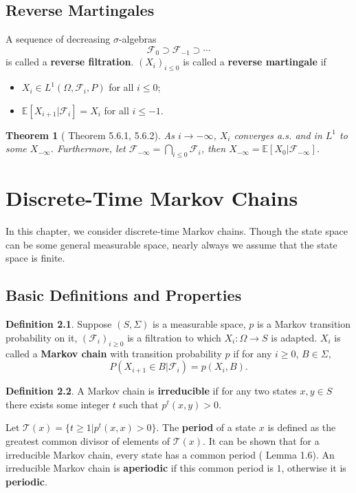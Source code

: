 \documentclass[openany]{book}
\newtheorem{theorem}{Theorem}[chapter]
\theoremstyle{definition}
\newtheorem{definition}{Definition}[chapter]
\theoremstyle{remark}
\begin{document}
\section{Reverse Martingales}
A sequence of decreasing $\sigma$-algebras
\begin{equation*}
    \mathcal{F}_0\supset \mathcal{F}_{-1}\supset\cdots
\end{equation*}
is called a \textbf{reverse filtration}. $(X_i)_{i\le0}$ is called a \textbf{reverse martingale} if
\begin{itemize}
    \item $X_i\in L^1(\Omega,\mathcal{F}_i,P)$ for all $i\le0$;
    \item $\mathbb{E}[X_{i+1}|\mathcal{F}_i]=X_i$ for all $i\le-1$.
\end{itemize}
\begin{theorem}[\cite{D10} Theorem 5.6.1, 5.6.2]
    As $i\to-\infty$, $X_i$ converges a.s. and in $L^1$ to some $X_{-\infty}$. Furthermore, let $\mathcal{F}_{-\infty}=\bigcap_{i\le0}\mathcal{F}_i$, then $X_{-\infty}=\mathbb{E}[X_0|\mathcal{F}_{-\infty}]$.
\end{theorem}

\chapter{Discrete-Time Markov Chains}
In this chapter, we consider discrete-time Markov chains. Though the state space can be some general measurable space, nearly always we assume that the state space is finite.

\section{Basic Definitions and Properties}
\begin{definition}
    Suppose $(S,\Sigma)$ is a measurable space, $p$ is a Markov transition probability on it, $(\mathcal{F}_i)_{i\ge0}$ is a filtration to which $X_i:\Omega\to S$ is adapted. $X_i$ is called a \textbf{Markov chain} with transition probability $p$ if for any $i\ge0$, $B\in\Sigma$,
    \begin{equation*}
        P(X_{i+1}\in B|\mathcal{F}_i)=p(X_i,B).
    \end{equation*}
\end{definition}

\begin{definition}
    A Markov chain is \textbf{irreducible} if for any two states $x,y\in S$ there exists some integer $t$ such that $p^t(x,y)>0$.
\end{definition}
Let $\mathcal{T}(x)=\{t\ge1|p^t(x,x)>0\}$. The \textbf{period} of a state $x$ is defined as the greatest common divisor of elements of $\mathcal{T}(x)$. It can be shown that for a irreducible Markov chain, every state has a common period (\cite{LP17} Lemma 1.6). An irreducible Markov chain is \textbf{aperiodic} if this common period is $1$, otherwise it is \textbf{periodic}.
\end{document}
